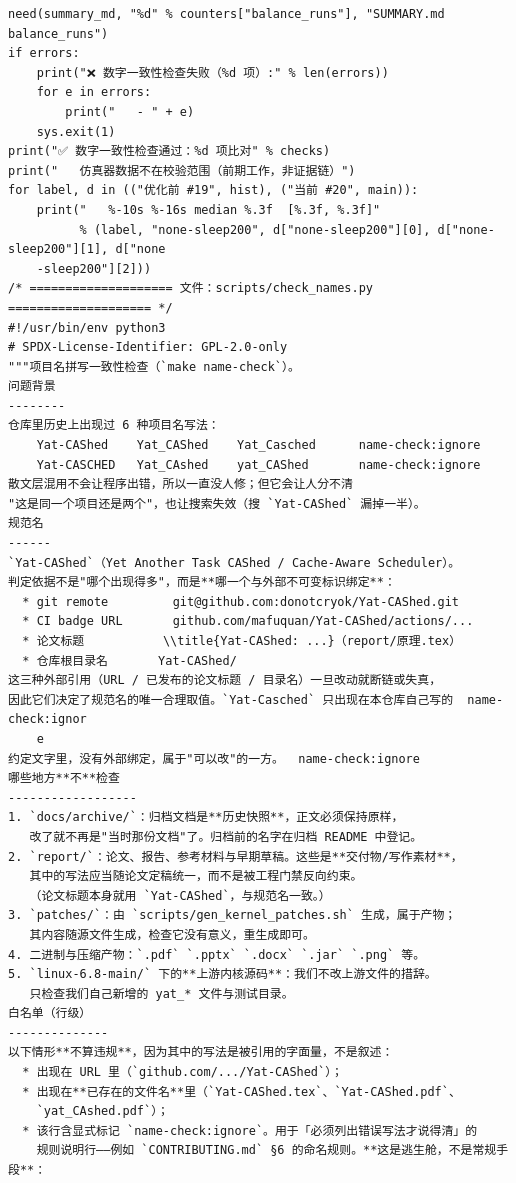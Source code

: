 \documentclass[10pt,a4paper]{article}
\newenvironment{yatpage}{\vspace*{0pt}}{\par}
\begin{document}
\newpage
\begin{yatpage}
\begin{Verbatim}[fontsize=\fontsize{8.2}{9.8}\selectfont]
need(summary_md, "%d" % counters["balance_runs"], "SUMMARY.md balance_runs")
if errors:
    print("❌ 数字一致性检查失败（%d 项）:" % len(errors))
    for e in errors:
        print("   - " + e)
    sys.exit(1)
print("✅ 数字一致性检查通过：%d 项比对" % checks)
print("   仿真器数据不在校验范围（前期工作，非证据链）")
for label, d in (("优化前 #19", hist), ("当前 #20", main)):
    print("   %-10s %-16s median %.3f  [%.3f, %.3f]"
          % (label, "none-sleep200", d["none-sleep200"][0], d["none-sleep200"][1], d["none
    -sleep200"][2]))
/* ==================== 文件：scripts/check_names.py ==================== */
#!/usr/bin/env python3
# SPDX-License-Identifier: GPL-2.0-only
"""项目名拼写一致性检查（`make name-check`）。
问题背景
--------
仓库里历史上出现过 6 种项目名写法：
    Yat-CAShed    Yat_CAShed    Yat_Casched      name-check:ignore
    Yat-CASCHED   Yat_CAshed    yat_CAShed       name-check:ignore
散文层混用不会让程序出错，所以一直没人修；但它会让人分不清
"这是同一个项目还是两个"，也让搜索失效（搜 `Yat-CAShed` 漏掉一半）。
规范名
------
`Yat-CAShed`（Yet Another Task CAShed / Cache-Aware Scheduler）。
判定依据不是"哪个出现得多"，而是**哪一个与外部不可变标识绑定**：
  * git remote         git@github.com:donotcryok/Yat-CAShed.git
  * CI badge URL       github.com/mafuquan/Yat-CAShed/actions/...
  * 论文标题           \\title{Yat-CAShed: ...}（report/原理.tex）
  * 仓库根目录名       Yat-CAShed/
这三种外部引用（URL / 已发布的论文标题 / 目录名）一旦改动就断链或失真，
因此它们决定了规范名的唯一合理取值。`Yat-Casched` 只出现在本仓库自己写的  name-check:ignor
    e
约定文字里，没有外部绑定，属于"可以改"的一方。  name-check:ignore
哪些地方**不**检查
------------------
1. `docs/archive/`：归档文档是**历史快照**，正文必须保持原样，
   改了就不再是"当时那份文档"了。归档前的名字在归档 README 中登记。
2. `report/`：论文、报告、参考材料与早期草稿。这些是**交付物/写作素材**，
   其中的写法应当随论文定稿统一，而不是被工程门禁反向约束。
   （论文标题本身就用 `Yat-CAShed`，与规范名一致。）
3. `patches/`：由 `scripts/gen_kernel_patches.sh` 生成，属于产物；
   其内容随源文件生成，检查它没有意义，重生成即可。
4. 二进制与压缩产物：`.pdf` `.pptx` `.docx` `.jar` `.png` 等。
5. `linux-6.8-main/` 下的**上游内核源码**：我们不改上游文件的措辞。
   只检查我们自己新增的 yat_* 文件与测试目录。
白名单（行级）
--------------
以下情形**不算违规**，因为其中的写法是被引用的字面量，不是叙述：
  * 出现在 URL 里（`github.com/.../Yat-CAShed`）；
  * 出现在**已存在的文件名**里（`Yat-CAShed.tex`、`Yat-CAShed.pdf`、
    `yat_CAshed.pdf`）；
  * 该行含显式标记 `name-check:ignore`。用于「必须列出错误写法才说得清」的
    规则说明行——例如 `CONTRIBUTING.md` §6 的命名规则。**这是逃生舱，不是常规手段**：
\end{Verbatim}
\end{yatpage}
\end{document}
